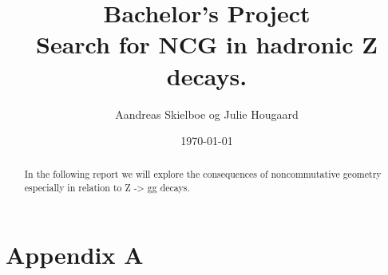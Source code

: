 \documentclass[11pt,a4paper,titlepage]{article}
\numberwithin{equation}{section}
\begin{document}
\title{Bachelor's Project\\Search for NCG in hadronic Z decays.}
\author{Aandreas Skielboe og Julie Hougaard}
\date{\today}
\maketitle
{}

\begin{abstract}
In the following report we will explore the consequences of noncommutative geometry especially in relation to Z -> gg decays.
\end{abstract}

\clearpage
\tableofcontents
\clearpage

















\clearpage



\clearpage



\section{Appendix A}







\end{document}
